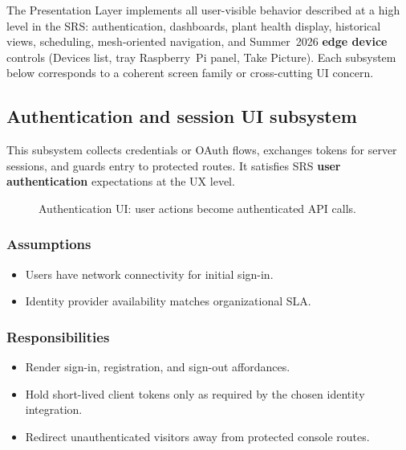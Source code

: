 The Presentation Layer implements all user-visible behavior described at a high level in the SRS: authentication, dashboards, plant health display, historical views, scheduling, mesh-oriented navigation, and Summer~2026 \textbf{edge device} controls (Devices list, tray Raspberry~Pi panel, Take Picture). Each subsystem below corresponds to a coherent screen family or cross-cutting UI concern.

\subsection{Authentication and session UI subsystem}

This subsystem collects credentials or OAuth flows, exchanges tokens for server sessions, and guards entry to protected routes. It satisfies SRS \textbf{user authentication} expectations at the UX level.

\begin{figure}[H]
\centering
{}
\caption{Authentication UI: user actions become authenticated API calls.}
\label{fig:pres-auth}
\end{figure}

\subsubsection{Assumptions}
\begin{itemize}
  \item Users have network connectivity for initial sign-in.
  \item Identity provider availability matches organizational SLA.
\end{itemize}

\subsubsection{Responsibilities}
\begin{itemize}
  \item Render sign-in, registration, and sign-out affordances.
  \item Hold short-lived client tokens only as required by the chosen identity integration.
  \item Redirect unauthenticated visitors away from protected console routes.
\end{itemize}

